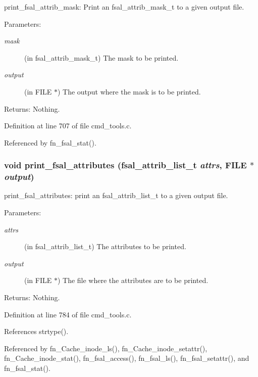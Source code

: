 print\_\-fsal\_\-attrib\_\-mask: Print an fsal\_\-attrib\_\-mask\_\-t to a given output file.

\begin{Desc}
\item[Parameters:]
\begin{description}
\item[{\em mask}](in fsal\_\-attrib\_\-mask\_\-t) The mask to be printed. \item[{\em output}](in FILE $\ast$) The output where the mask is to be printed. \end{description}
\end{Desc}
\begin{Desc}
\item[Returns:]Nothing. \end{Desc}


Definition at line 707 of file cmd\_\-tools.c.

Referenced by fn\_\-fsal\_\-stat().
\subsubsection{\setlength{\rightskip}{0pt plus 5cm}void print\_\-fsal\_\-attributes (fsal\_\-attrib\_\-list\_\-t {\em attrs}, FILE $\ast$ {\em output})}\label{cmd__tools_8h_a21}


print\_\-fsal\_\-attributes: print an fsal\_\-attrib\_\-list\_\-t to a given output file.

\begin{Desc}
\item[Parameters:]
\begin{description}
\item[{\em attrs}](in fsal\_\-attrib\_\-list\_\-t) The attributes to be printed. \item[{\em output}](in FILE $\ast$) The file where the attributes are to be printed. \end{description}
\end{Desc}
\begin{Desc}
\item[Returns:]Nothing. \end{Desc}


Definition at line 784 of file cmd\_\-tools.c.

References strtype().

Referenced by fn\_\-Cache\_\-inode\_\-ls(), fn\_\-Cache\_\-inode\_\-setattr(), fn\_\-Cache\_\-inode\_\-stat(), fn\_\-fsal\_\-access(), fn\_\-fsal\_\-ls(), fn\_\-fsal\_\-setattr(), and fn\_\-fsal\_\-stat().
